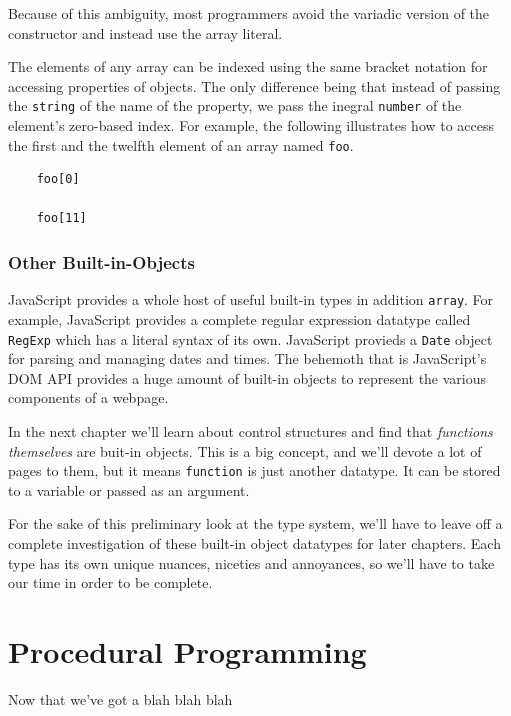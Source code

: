 \documentclass[11pt,letter]{book}
\begin{document}
    Because of this ambiguity, most programmers avoid the variadic version of the constructor and 
    instead use the array literal.
    
    The elements of any array can be indexed using the same bracket notation for accessing 
    properties of objects. The only difference being that instead of passing the \texttt{string} of 
    the name of the property, we pass the inegral \texttt{number} of the element's zero-based index.
    For example, the following illustrates how to access the first and the twelfth element of an 
    array named \texttt{foo}.
    
    \begin{verbatim}
    foo[0]
    
    foo[11]
    \end{verbatim}
    
    \subsection{Other Built-in-Objects}
    JavaScript provides a whole host of useful built-in types in addition \texttt{array}. For 
    example, JavaScript provides a complete regular expression datatype called \texttt{RegExp} which
    has a literal syntax of its own. JavaScript provieds a \texttt{Date} object for parsing and 
    managing dates and times. The behemoth that is JavaScript's DOM API provides a huge amount of 
    built-in objects to represent the various components of a webpage.
    
    In the next chapter we'll learn about control structures and find that \emph{functions 
    themselves} are buit-in objects. This is a big concept, and we'll devote a lot of pages to them,
    but it means \texttt{function} is just another datatype. It can be stored to a variable or 
    passed as an argument.
    
    For the sake of this preliminary look at the type system, we'll have to leave off a complete 
    investigation of these built-in object datatypes for later chapters. Each type has its own 
    unique nuances, niceties and annoyances, so we'll have to take our time in order to be complete.
    
    \chapter{Procedural Programming}
    Now that we've got a blah blah blah
    
\end{document}
